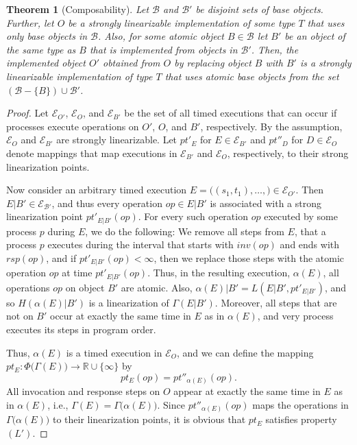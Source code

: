 \documentclass[11pt,letterpaper]{article}
\newtheorem{theorem}{Theorem}[section]
\newcommand{\BB}{\mathcal{B}}
\newcommand{\EE}{\mathcal{E}}
\begin{document}
\begin{theorem}[Composability]\label{thm:composability}
  Let $\BB$ and $\BB'$ be disjoint sets of base objects. Further, let $O$ be a strongly linearizable implementation of some type $T$ that uses only base objects in $\BB$.
  Also, for some atomic object $B\in \BB$ let $B'$ be an object of the same type as $B$ that is implemented from objects in $\BB'$.
  Then, the implemented object $O'$ obtained from $O$ by replacing object $B$  with $B'$ is a strongly linearizable implementation of type $T$ that uses atomic base objects from the set $(\BB-\{B\})\cup \BB'$.
\end{theorem}
\begin{proof}
  Let $\EE_{O'}$, $\EE_{O}$, and $\EE_{B'}$ be the set of all timed executions that can occur if processes execute operations on $O'$, $O$, and $B'$, respectively.
  By the assumption, $\EE_{O}$ and $\EE_{B'}$ are strongly linearizable.
  Let $pt'_E$ for $E\in\EE_{B'}$ and $pt''_D$ for $D\in\EE_{O}$ denote mappings that map executions in $\EE_{B'}$ and $\EE_{O}$, respectively, to their strong linearization points.

  Now consider an arbitrary timed execution $E=\bigl((s_1,t_1),\dots,\bigr)\in\EE_{O'}$.
  Then $E|B'\in\EE_{\BB'}$, and thus every operation $op\in E|B'$ is associated with a strong linearization point $pt'_{E|B'}(op)$.
  For every such operation $op$ executed by some process $p$ during $E$, we do the following:
  We remove all steps from $E$, that a process $p$ executes during the interval that starts with $inv(op)$ and ends with $rsp(op)$, and if $pt'_{E|B'}(op)<\infty$, then we replace those steps  with the atomic operation $op$ at time $pt'_{E|B'}(op)$.
  Thus, in the resulting execution, $\alpha(E)$, all operations $op$ on object $B'$ are atomic.
  Also, $\alpha(E)|B'=L(E|B',pt'_{E|B'})$, and so $H(\alpha(E)|B')$ is a linearization of $\Gamma(E|B')$.
  Moreover, all steps that are not on $B'$ occur at exactly the same time in $E$ as in $\alpha(E)$, and very process executes its steps in program order.

  Thus, $\alpha(E)$ is a timed execution in $\EE_{O}$, and we can define the mapping $pt_E:\Phi\bigl(\Gamma(E)\bigr)\to\mathds{R}\cup\{\infty\}$ by
  \begin{displaymath}
    pt_E(op)=pt''_{\alpha(E)}(op).
  \end{displaymath}
    All invocation and response steps on $O$ appear at exactly the same time in $E$ as in $\alpha(E)$, i.e., $\Gamma(E)=\Gamma\bigl(\alpha(E)\bigr)$.
    Since $pt''_{\alpha(E)}(op)$ maps the operations in $\Gamma\bigl(\alpha(E)\bigr)$ to their linearization points, it is obvious that $pt_E$ satisfies property $(L')$.


\end{proof}
\end{document}
